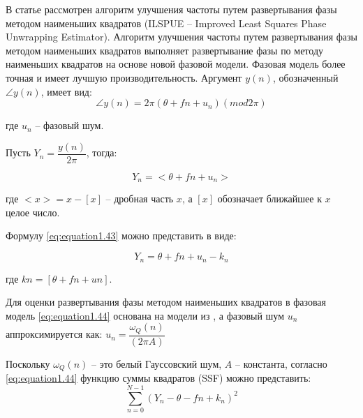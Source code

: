 В статье \cite{zhou2018improved} рассмотрен алгоритм улучшения частоты путем развертывания фазы методом наименьших квадратов (ILSPUE -- Improved Least Squares Phase Unwrapping Estimator). Алгоритм улучшения частоты путем развертывания фазы методом наименьших квадратов выполняет развертывание фазы по методу наименьших квадратов на основе новой фазовой модели. Фазовая модель более точная и имеет лучшую производительность.
Аргумент $y(n)$, обозначенный $\angle y(n)$, имеет вид:
\begin{equation}
	\label{eq:equation1.42}	
	\angle y(n)=2 \pi(\theta+fn+u_n)(mod2 \pi)
\end{equation}

где $u_n$ -- фазовый шум. 

Пусть $Y_n = \dfrac{y(n)}{2 \pi}$, тогда:

\begin{equation}
	\label{eq:equation1.43}	
	Y_n =<\theta+fn+u_n>
\end{equation}

где $<x> = x - [x]$ -- дробная часть $x$, а $[x]$ обозначает ближайшее к $x$ целое число. 

Формулу \ref{eq:equation1.43} можно представить в виде:

\begin{equation}
	\label{eq:equation1.44}	
	Y_n= \theta+fn+u_n-k_n
\end{equation}

где $kn =[\theta + fn + un]$.
 
Для оценки развертывания фазы методом наименьших квадратов в \cite{mckilliam2010frequency, 7456233} фазовая модель \ref{eq:equation1.44} основана на модели из \cite{1057115}, а фазовый шум $u_n$ аппроксимируется как: $u_n=\dfrac{\omega_Q(n)}{(2 \pi A)}$

Поскольку $\omega_Q(n)$ -- это белый Гауссовский шум, $A$ -- константа, согласно \ref{eq:equation1.44} функцию суммы квадратов (SSF) можно представить:
\begin{equation}
	\label{eq:equation1.45}		
	\sum_{n=0}^{N-1} (Y_n- \theta -fn +k_n)^2
\end{equation}

